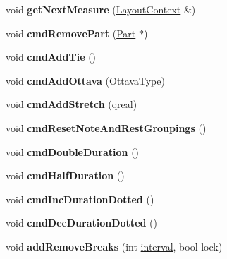 \begin{DoxyCompactItemize}
\item 
\mbox{\label{class_ms_1_1_score_a5504cca91c6aafce127cf4de5d0e49de}} 
void {\bfseries get\+Next\+Measure} (\hyperlink{struct_ms_1_1_layout_context}{Layout\+Context} \&)
\item 
\mbox{\label{class_ms_1_1_score_a77713d57c648bd0e035724cc6c0631bc}} 
void {\bfseries cmd\+Remove\+Part} (\hyperlink{class_ms_1_1_part}{Part} $\ast$)
\item 
\mbox{\label{class_ms_1_1_score_a092ebb2a369e1a973e086131748e27e5}} 
void {\bfseries cmd\+Add\+Tie} ()
\item 
\mbox{\label{class_ms_1_1_score_ab3fc19ce9168d648919136e96f709d4b}} 
void {\bfseries cmd\+Add\+Ottava} (Ottava\+Type)
\item 
\mbox{\label{class_ms_1_1_score_ac97c187c4f49fe2829b24ea2ae197119}} 
void {\bfseries cmd\+Add\+Stretch} (qreal)
\item 
\mbox{\label{class_ms_1_1_score_ab9e12d6961837362a1babbd4c88acc2d}} 
void {\bfseries cmd\+Reset\+Note\+And\+Rest\+Groupings} ()
\item 
\mbox{\label{class_ms_1_1_score_a50244a580e1c41c9a38925424b1e24b4}} 
void {\bfseries cmd\+Double\+Duration} ()
\item 
\mbox{\label{class_ms_1_1_score_a42d7abd60474d8bfe8754c4adbdaf05d}} 
void {\bfseries cmd\+Half\+Duration} ()
\item 
\mbox{\label{class_ms_1_1_score_a56d18e3aafaac78ae38c2ed4428498ed}} 
void {\bfseries cmd\+Inc\+Duration\+Dotted} ()
\item 
\mbox{\label{class_ms_1_1_score_af64b5d63e7bbbbd37308f4c014877daa}} 
void {\bfseries cmd\+Dec\+Duration\+Dotted} ()
\item 
\mbox{\label{class_ms_1_1_score_adfc02ac3d2a322f33fb63521671f835d}} 
void {\bfseries add\+Remove\+Breaks} (int \hyperlink{class_interval}{interval}, bool lock)

\end{DoxyCompactItemize}
